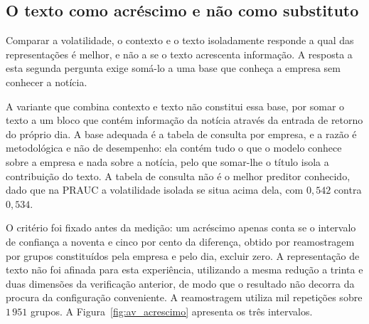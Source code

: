 \subsection{O texto como acréscimo e não como substituto}
\label{sec:av_acrescimo}

Comparar a volatilidade, o contexto e o texto isoladamente responde a qual das representações é
melhor, e não a se o texto acrescenta informação. A resposta a esta segunda pergunta exige somá-lo a
uma base que conheça a empresa sem conhecer a notícia.

A variante que combina contexto e texto não constitui essa base, por somar o texto a um bloco que
contém informação da notícia através da entrada de retorno do próprio dia. A base adequada é a tabela
de consulta por empresa, e a razão é metodológica e não de desempenho: ela contém tudo o que o modelo
conhece sobre a empresa e nada sobre a notícia, pelo que somar-lhe o título isola a contribuição do
texto. A tabela de consulta não é o melhor preditor conhecido, dado que na \gls{PRAUC} a volatilidade
isolada se situa acima dela, com $0{,}542$ contra $0{,}534$.

O critério foi fixado antes da medição: um acréscimo apenas conta se o intervalo de confiança a
noventa e cinco por cento da diferença, obtido por reamostragem por grupos constituídos pela empresa
e pelo dia, excluir zero. A representação de texto não foi afinada para esta experiência, utilizando
a mesma redução a trinta e duas dimensões da verificação anterior, de modo que o resultado não decorra
da procura da configuração conveniente. A reamostragem utiliza mil repetições sobre $1\,951$ grupos.
A Figura~\ref{fig:av_acrescimo} apresenta os três intervalos.

